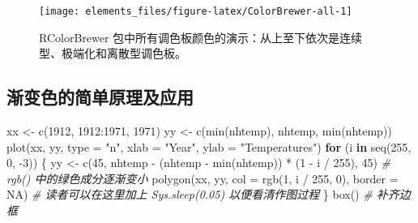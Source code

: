 \documentclass[
  b5paper,
  UTF8,twoside]{book}
\newenvironment{Shaded}{\begin{snugshade}}{\end{snugshade}}
\newcommand{\AttributeTok}[1]{\textcolor[rgb]{0.77,0.63,0.00}{#1}}
\newcommand{\CommentTok}[1]{\textcolor[rgb]{0.56,0.35,0.01}{\textit{#1}}}
\newcommand{\ConstantTok}[1]{\textcolor[rgb]{0.00,0.00,0.00}{#1}}
\newcommand{\ControlFlowTok}[1]{\textcolor[rgb]{0.13,0.29,0.53}{\textbf{#1}}}
\newcommand{\DecValTok}[1]{\textcolor[rgb]{0.00,0.00,0.81}{#1}}
\newcommand{\FunctionTok}[1]{\textcolor[rgb]{0.00,0.00,0.00}{#1}}
\newcommand{\NormalTok}[1]{#1}
\newcommand{\OtherTok}[1]{\textcolor[rgb]{0.56,0.35,0.01}{#1}}
\newcommand{\SpecialCharTok}[1]{\textcolor[rgb]{0.00,0.00,0.00}{#1}}
\newcommand{\StringTok}[1]{\textcolor[rgb]{0.31,0.60,0.02}{#1}}
\begin{document}
\begin{figure}

{\centering \texttt{[image: elements\_files/figure-latex/ColorBrewer-all-1]} 

}

\caption[RColorBrewer 包中所有调色板颜色的演示 ]{RColorBrewer 包中所有调色板颜色的演示：从上至下依次是连续型、极端化和离散型调色板。}\label{fig:ColorBrewer-all}
\end{figure}



\hypertarget{ux6e10ux53d8ux8272ux7684ux7b80ux5355ux539fux7406ux53caux5e94ux7528}{%
\subsection{渐变色的简单原理及应用}\label{ux6e10ux53d8ux8272ux7684ux7b80ux5355ux539fux7406ux53caux5e94ux7528}}

\begin{Shaded}
\begin{Highlighting}[]
\NormalTok{xx }\OtherTok{\textless{}{-}} \FunctionTok{c}\NormalTok{(}\DecValTok{1912}\NormalTok{, }\DecValTok{1912}\SpecialCharTok{:}\DecValTok{1971}\NormalTok{, }\DecValTok{1971}\NormalTok{)}
\NormalTok{yy }\OtherTok{\textless{}{-}} \FunctionTok{c}\NormalTok{(}\FunctionTok{min}\NormalTok{(nhtemp), nhtemp, }\FunctionTok{min}\NormalTok{(nhtemp))}
\FunctionTok{plot}\NormalTok{(xx, yy, }\AttributeTok{type =} \StringTok{"n"}\NormalTok{, }\AttributeTok{xlab =} \StringTok{"Year"}\NormalTok{, }\AttributeTok{ylab =} \StringTok{"Temperatures"}\NormalTok{)}
\ControlFlowTok{for}\NormalTok{ (i }\ControlFlowTok{in} \FunctionTok{seq}\NormalTok{(}\DecValTok{255}\NormalTok{, }\DecValTok{0}\NormalTok{, }\SpecialCharTok{{-}}\DecValTok{3}\NormalTok{)) \{}
\NormalTok{  yy }\OtherTok{\textless{}{-}} \FunctionTok{c}\NormalTok{(}\DecValTok{45}\NormalTok{, nhtemp }\SpecialCharTok{{-}}\NormalTok{ (nhtemp }\SpecialCharTok{{-}} \FunctionTok{min}\NormalTok{(nhtemp)) }\SpecialCharTok{*}\NormalTok{ (}\DecValTok{1} \SpecialCharTok{{-}}\NormalTok{ i }\SpecialCharTok{/} \DecValTok{255}\NormalTok{), }\DecValTok{45}\NormalTok{) }\CommentTok{\# rgb() 中的绿色成分逐渐变小}
  \FunctionTok{polygon}\NormalTok{(xx, yy, }\AttributeTok{col =} \FunctionTok{rgb}\NormalTok{(}\DecValTok{1}\NormalTok{, i }\SpecialCharTok{/} \DecValTok{255}\NormalTok{, }\DecValTok{0}\NormalTok{), }\AttributeTok{border =} \ConstantTok{NA}\NormalTok{)}
  \CommentTok{\# 读者可以在这里加上 Sys.sleep(0.05) 以便看清作图过程}
\NormalTok{\}}
\FunctionTok{box}\NormalTok{() }\CommentTok{\# 补齐边框}
\end{Highlighting}
\end{Shaded}
\end{document}
